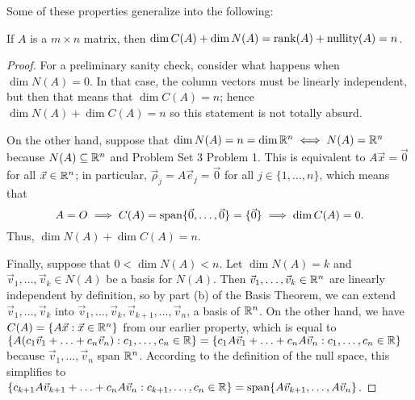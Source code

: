 \documentclass[main.tex]{subfiles}
\begin{document}
Some of these properties generalize into the following:
\begin{theorem}
    If $A$ is a $m\times n$ matrix, then $\dim C(A) + \dim N(A) = \operatorname{rank} (A) + \text{nullity}(A) = n$.
\end{theorem}
\begin{proof}
    For a preliminary sanity check, consider what happens when $\dim N(A) = 0$. In that case, the column vectors must be linearly independent, but then that means that $\dim C(A) = n$; hence $\dim N(A) + \dim C(A) = n$ so this statement is not totally absurd.
    
    On the other hand, suppose that $\dim N(A) = n = \dim \mathbb R^n\iff N(A) = \mathbb R^n$ because $N(A)\subseteq \mathbb R^n$ and Problem Set 3 Problem 1. This is equivalent to $A\vec{x} = \vec{0}$ for all $\vec{x}\in \mathbb R^n$; in particular, $\vec{\rho}_j = A\vec{e}_j = \vec{0}$ for all $j\in \{1, \ldots , n\}$, which means that
    \[A = O\implies C(A) = \operatorname{span}\{\vec{0}, \ldots , \vec{0}\} = \{\vec{0}\}\implies \dim C(A) = 0.\]
    Thus, $\dim N(A) + \dim C(A) = n$.

    Finally, suppose that $0 < \dim N(A) < n$. Let $\dim N(A) = k$ and $\vec{v}_1, \ldots , \vec{v}_{k} \in N(A)$ be a basis for $N(A)$. Then $\vec{v}_1, \ldots , \vec{v}_{k} \in \mathbb R^n$ are linearly independent by definition, so by part (b) of the Basis Theorem, we can extend $\vec{v}_1, \ldots , \vec{v}_{k}$ into $\vec{v}_1, \ldots , \vec{v}_{k}, \vec{v}_{k + 1}, \ldots , \vec{v}_n$, a basis of $\mathbb R^n$. On the other hand, we have $C(A) = \{A\vec{x} : \vec{x}\in \mathbb R^n\}$ from our earlier property, which is equal to $\{A(c_1\vec{v}_1 + \ldots + c_n\vec{v}_n) : c_1,\ldots , c_n\in \mathbb R\} = \{c_1A\vec{v}_1 + \ldots + c_nA\vec{v}_n : c_1,\ldots , c_n\in \mathbb R\}$ because $\vec{v}_1 , \ldots , \vec{v}_n$ span $\mathbb R^n$. According to the definition of the null space, this simplifies to $\{c_{k + 1}A\vec{v}_{k + 1} + \ldots + c_nA\vec{v}_n : c_{k + 1}, \ldots , c_n\in \mathbb R\} = \operatorname{span}\{A\vec{v}_{k + 1} , \ldots , A\vec{v}_n\}$.
    

\end{proof}
\end{document}
